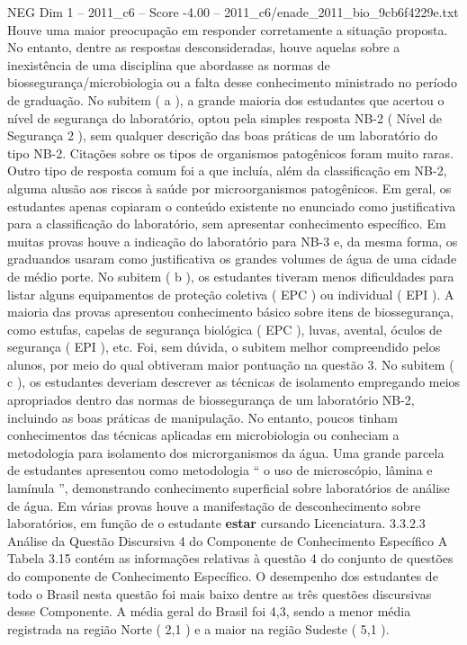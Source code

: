 \begin{textsample}{NEG Dim 1 – 2011\_c6 – Score -4.00 – 2011\_c6/enade\_2011\_bio\_9cb6f4229e.txt}
Houve uma maior preocupação em responder corretamente a situação proposta.
No entanto, dentre as respostas desconsideradas, houve aquelas sobre a inexistência de uma disciplina que abordasse as normas de biossegurança/microbiologia ou a falta desse conhecimento ministrado no período de graduação.
No subitem ( a ), a grande maioria dos estudantes que acertou o nível de segurança do laboratório, optou pela simples resposta NB-2 ( Nível de Segurança 2 ), sem qualquer descrição das boas práticas de um laboratório do tipo NB-2.
Citações sobre os tipos de organismos patogênicos foram muito raras.
Outro tipo de resposta comum foi a que incluía, além da classificação em NB-2, alguma alusão aos riscos à saúde por microorganismos patogênicos.
Em geral, os estudantes apenas copiaram o conteúdo existente no enunciado como justificativa para a classificação do laboratório, sem apresentar conhecimento específico.
Em muitas provas houve a indicação do laboratório para NB-3 e, da mesma forma, os graduandos usaram como justificativa os grandes volumes de água de uma cidade de médio porte.
No subitem ( b ), os estudantes tiveram menos dificuldades para listar alguns equipamentos de proteção coletiva ( EPC ) ou individual ( EPI ).
A maioria das provas apresentou conhecimento básico sobre itens de biossegurança, como estufas, capelas de segurança biológica ( EPC ), luvas, avental, óculos de segurança ( EPI ), etc.
Foi, sem dúvida, o subitem melhor compreendido pelos alunos, por meio do qual obtiveram maior pontuação na questão 3.
No subitem ( c ), os estudantes deveriam descrever as técnicas de isolamento empregando meios apropriados dentro das normas de biossegurança de um laboratório NB-2, incluindo as boas práticas de manipulação.
No entanto, poucos tinham conhecimentos das técnicas aplicadas em microbiologia ou conheciam a metodologia para isolamento dos microrganismos da água.
Uma grande parcela de estudantes apresentou como metodologia “ o uso de microscópio, lâmina e lamínula ”, demonstrando conhecimento superficial sobre laboratórios de análise de água.
Em várias provas houve a manifestação de desconhecimento sobre laboratórios, em função de o estudante \textbf{estar} cursando Licenciatura. 3.3.2.3 Análise da Questão Discursiva 4 do Componente de Conhecimento Específico A Tabela 3.15 contém as informações relativas à questão 4 do conjunto de questões do componente de Conhecimento Específico.
O desempenho dos estudantes de todo o Brasil nesta questão foi mais baixo dentre as três questões discursivas desse Componente.
A média geral do Brasil foi 4,3, sendo a menor média registrada na região Norte ( 2,1 ) e a maior na região Sudeste ( 5,1 ).

\end{textsample}
